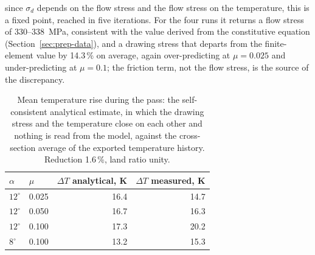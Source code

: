 \documentclass[subscriptcorrection,upint,varvw,barcolor=Goldenrod3,mathalfa=cal=euler,balance,hyphenate,french,pdf-a]{asmejour} %
\begin{document}


since $\sigma_d$ depends on the flow stress and the flow
stress on the temperature, this is a fixed point, reached in five iterations. For the four runs it
returns a flow stress of 330--338~MPa, consistent with the value derived from the constitutive
equation (Section~\ref{sec:prep-data}), and a drawing stress that departs from the finite-element
value by 14.3\,\% on average, again over-predicting at $\mu = 0.025$ and under-predicting at
$\mu = 0.1$; the friction term, not the flow stress, is the source of the discrepancy.


\begin{table}[htbp]
\centering\small
\caption{Mean temperature rise during the pass: the self-consistent analytical estimate, in which
the drawing stress and the temperature close on each other and nothing is read from the model,
against the cross-section average of the exported temperature history. Reduction 1.6\,\%, land
ratio unity.}
\label{tab:deltaT}
\begin{tabular}{@{}llrr@{}}
\toprule
$\alpha$ & $\mu$ & $\Delta T$ analytical, K & $\Delta T$ measured, K \\
\midrule
$12^\circ$ & 0.025 & 16.4 & 14.7 \\
$12^\circ$ & 0.050 & 16.7 & 16.3 \\
$12^\circ$ & 0.100 & 17.3 & 20.2 \\
$8^\circ$  & 0.100 & 13.2 & 15.3 \\
\bottomrule
\end{tabular}
\end{table}
\end{document}
